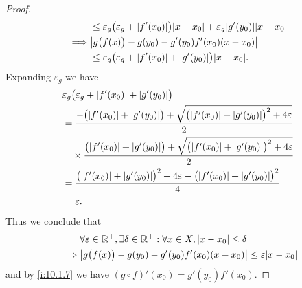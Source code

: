 \begin{proof}
\begin{align*}
             & \leq \varepsilon_g \big(\varepsilon_g + \abs{f'(x_0)}\big) \abs{x - x_0} + \varepsilon_g \abs{g'(y_0)} \abs{x - x_0} \\
    \implies & \abs{g\big(f(x)\big) - g(y_0) - g'(y_0) f'(x_0) (x - x_0)}                                                           \\
             & \leq \varepsilon_g \big(\varepsilon_g + \abs{f'(x_0)} + \abs{g'(y_0)}\big) \abs{x - x_0}.
  \end{align*}
  Expanding \(\varepsilon_g\) we have
  \begin{align*}
     & \varepsilon_g \big(\varepsilon_g + \abs{f'(x_0)} + \abs{g'(y_0)}\big)                                                              \\
     & = \dfrac{-\big(\abs{f'(x_0)} + \abs{g'(y_0)}\big) + \sqrt{\big(\abs{f'(x_0)} + \abs{g'(y_0)}\big)^2 + 4 \varepsilon}}{2}           \\
     & \quad \times \dfrac{\big(\abs{f'(x_0)} + \abs{g'(y_0)}\big) + \sqrt{\big(\abs{f'(x_0)} + \abs{g'(y_0)}\big)^2 + 4 \varepsilon}}{2} \\
     & = \dfrac{\big(\abs{f'(x_0)} + \abs{g'(y_0)}\big)^2 + 4 \varepsilon - \big(\abs{f'(x_0)} + \abs{g'(y_0)}\big)^2}{4}                 \\
     & = \varepsilon.
  \end{align*}
  Thus we conclude that
  \begin{align*}
             & \forall \varepsilon \in \R^+, \exists \delta \in \R^+ : \forall x \in X, \abs{x - x_0} \leq \delta \\
    \implies & \abs{g\big(f(x)\big) - g(y_0) - g'(y_0) f'(x_0) (x - x_0)} \leq \varepsilon \abs{x - x_0}
  \end{align*}
  and by \cref{i:10.1.7} we have \((g \circ f)'(x_0) = g'(y_0) f'(x_0)\).
\end{proof}

